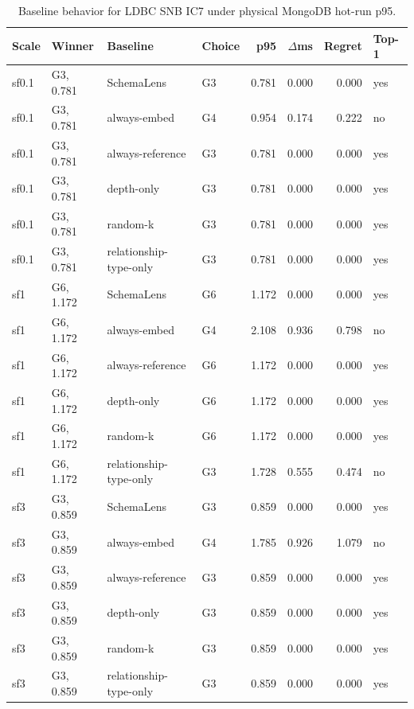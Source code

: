 \begin{table}[t]
\centering
\caption{Baseline behavior for LDBC SNB IC7 under physical MongoDB hot-run p95.}
\label{tab:ldbc-ic7-physical-baseline}
\small
\begin{tabular}{llllrrrl}
\toprule
Scale & Winner & Baseline & Choice & p95 & $\Delta$ms & Regret & Top-1 \\
\midrule
sf0.1 & G3, 0.781 & SchemaLens & G3 & 0.781 & 0.000 & 0.000 & yes \\
sf0.1 & G3, 0.781 & always-embed & G4 & 0.954 & 0.174 & 0.222 & no \\
sf0.1 & G3, 0.781 & always-reference & G3 & 0.781 & 0.000 & 0.000 & yes \\
sf0.1 & G3, 0.781 & depth-only & G3 & 0.781 & 0.000 & 0.000 & yes \\
sf0.1 & G3, 0.781 & random-k & G3 & 0.781 & 0.000 & 0.000 & yes \\
sf0.1 & G3, 0.781 & relationship-type-only & G3 & 0.781 & 0.000 & 0.000 & yes \\
sf1 & G6, 1.172 & SchemaLens & G6 & 1.172 & 0.000 & 0.000 & yes \\
sf1 & G6, 1.172 & always-embed & G4 & 2.108 & 0.936 & 0.798 & no \\
sf1 & G6, 1.172 & always-reference & G6 & 1.172 & 0.000 & 0.000 & yes \\
sf1 & G6, 1.172 & depth-only & G6 & 1.172 & 0.000 & 0.000 & yes \\
sf1 & G6, 1.172 & random-k & G6 & 1.172 & 0.000 & 0.000 & yes \\
sf1 & G6, 1.172 & relationship-type-only & G3 & 1.728 & 0.555 & 0.474 & no \\
sf3 & G3, 0.859 & SchemaLens & G3 & 0.859 & 0.000 & 0.000 & yes \\
sf3 & G3, 0.859 & always-embed & G4 & 1.785 & 0.926 & 1.079 & no \\
sf3 & G3, 0.859 & always-reference & G3 & 0.859 & 0.000 & 0.000 & yes \\
sf3 & G3, 0.859 & depth-only & G3 & 0.859 & 0.000 & 0.000 & yes \\
sf3 & G3, 0.859 & random-k & G3 & 0.859 & 0.000 & 0.000 & yes \\
sf3 & G3, 0.859 & relationship-type-only & G3 & 0.859 & 0.000 & 0.000 & yes \\
\bottomrule
\end{tabular}
\end{table}

